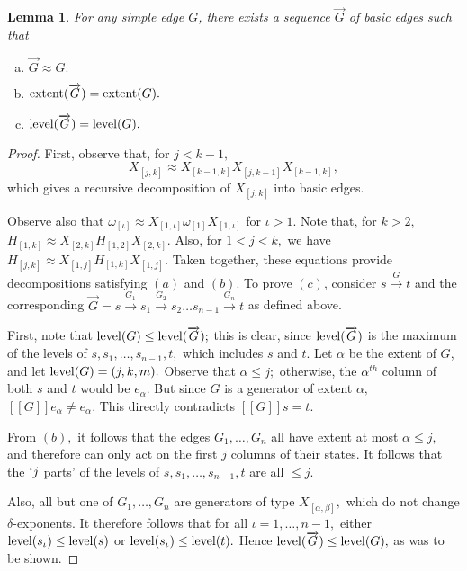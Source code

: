 \documentclass{dalthesis}
\theoremstyle{theorem}
\newtheorem{lemma}[theorem]{Lemma}
\theoremstyle{definition}
\theoremstyle{definition}  %
\theoremstyle{definition}
\newcommand{\sem}[1]{[\![#1]\!]}
\newcommand{\jay}{j}
\newcommand{\kay}{k}
\renewcommand{\:}{\mathbin{:}}
\newcommand{\level}{\mathop{\rm level}\nolimits}
\newcommand{\extent}{\mathop{\rm extent}\nolimits}
\newcommand{\edge}{\xrightarrow}
\renewcommand{\vec}{\overrightarrow}
\begin{document}
\begin{lemma}
\label{BasicGenLemma}
For any simple edge $G$, there exists a sequence $\vec{G}$ of basic edges such that
\begin{enumerate}[(a)]
\item $\vec{G}\approx G.$
\item $\extent(\vec{G})=\extent(G).$
\item $\level(\vec{G})=\level(G).$
\end{enumerate}
\end{lemma}
\begin{proof}
First, observe that, for $\jay < \kay - 1,$ \[X_{[\jay,\kay]} \approx X_{[\kay-1,\kay]}X_{[\jay,\kay-1]}X_{[\kay-1,\kay]},\] which gives a recursive decomposition of $X_{[\jay,\kay]}$ into basic edges.

Observe also that $\omega_{[\iota]} \approx X_{[1,\iota]}\omega_{[1]}X_{[1,\iota]}$ for $\iota>1.$ Note that, for $\kay > 2,$ $H_{[1,\kay]} \approx X_{[2,\kay]}H_{[1,2]}X_{[2,\kay]}.$ Also, for $1 < \jay < \kay,$ we have $H_{[\jay,\kay]}\approx X_{[1,\jay]}H_{[1,\kay]}X_{[1,\jay]}.$ Taken together, these equations provide decompositions satisfying $(a)$ and $(b).$ To prove $(c)$, consider $s\edge{G}t$ and the corresponding $\vec{G} = s\edge{G_1}s_1\edge{G_2}s_2\ldots s_{n-1}\edge{G_n}t$ as defined above.

First, note that $\level(G)\leq\level(\vec{G});$ this is clear, since $\level(\vec{G})$ is the maximum of the levels of $s,s_1,\ldots ,s_{n-1},t,$ which includes $s$ and $t.$ Let $\alpha$ be the extent of $G$, and let $\level(G) = (\jay,\kay,m).$ Observe that $\alpha\leq\jay;$ otherwise, the $\alpha^{th}$ column of both $s$ and $t$ would be $e_\alpha.$ But since $G$ is a generator of extent $\alpha,$ $\sem{G}e_\alpha\neq e_\alpha.$ This directly contradicts $\sem{G}s=t.$

From $(b),$ it follows that the edges $G_1,\ldots ,G_n$ all have extent at most $\alpha\leq j,$ and therefore can only act on the first $\jay$ columns of their states. It follows that the $`\jay$ parts' of the levels of $s,s_1,\ldots ,s_{n-1},t$ are all $\leq\jay.$

Also, all but one of $G_1,\ldots ,G_n$ are generators of type $X_{[\alpha,\beta]},$ which do not change $\delta$-exponents. It therefore follows that for all $\iota = 1,\ldots ,n-1,$ either $\level(s_\iota)\leq\level(s)$ or $\level(s_\iota)\leq\level(t).$ Hence $\level(\vec{G})\leq\level(G),$ as was to be shown.
\end{proof}
\end{document}
